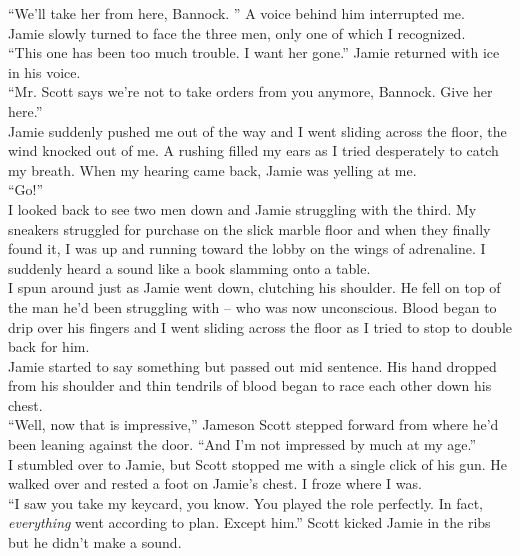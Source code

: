 \documentclass[a5paper]{scrartcl}
\begin{document}
\enquote{We'll take her from here, Bannock. } A voice behind him interrupted me. \\


Jamie slowly turned to face the three men, only one of which I recognized.\\


\enquote{This one has been too much trouble. I want her gone.} Jamie returned with ice in his voice.\\


\enquote{Mr. Scott says we're not to take orders from you anymore, Bannock. Give her here.}\\


Jamie suddenly pushed me out of the way and I went sliding across the floor, the wind knocked out of me.  A rushing filled my ears as I tried desperately to catch my breath. When my hearing came back, Jamie was yelling at me.\\


\enquote{Go!}\\


I looked back to see two men down and Jamie struggling with the third. My sneakers struggled for purchase on the slick marble floor and when they finally found it, I was up and running toward the lobby on the wings of adrenaline. I suddenly heard a sound like a book slamming onto a table. \\


I spun around just as Jamie went down, clutching his shoulder. He fell on top of the man he'd been struggling with -- who was now unconscious.   Blood began to drip over his fingers and I went sliding across the floor as I tried to stop to double back for him. \\


Jamie started to say something but passed out mid sentence. His hand dropped from his shoulder and thin tendrils of blood began to race each other down his chest.\\


\enquote{Well, now that is impressive,} Jameson Scott stepped forward from where he'd been leaning against the door. \enquote{And I'm not impressed by much at my age.}\\


I stumbled over to Jamie, but Scott stopped me with a single click of his gun. He walked over and rested a foot on Jamie's chest. I froze where I was. \\


\enquote{I saw you take my keycard, you know. You played the role perfectly. In fact, \textit{everything}
 went according to plan. Except him.} Scott kicked Jamie in the ribs but he didn't make a sound.\\
\end{document}
